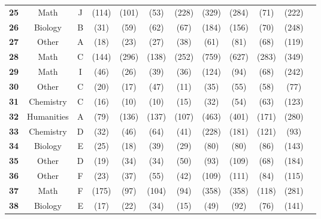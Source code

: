 \begin{table*}[htb]
\begin{center}
\begin{tiny}
\begin{tabular}{l|c|c|ccccccccc}
\textbf{25} & Math & J  & \X [D] (114) & \X [I] (101) & \X [K] (53) & \X [G] (228) & \X [A] (329) & \X [I] (284) & \X [K] (71) & \X [K] (222)\\
\textbf{26} & Biology & B  & \X [C] (31) & \X [C] (59) & \X [D] (62) & \X [C] (67) & \X [C] (184) & \X [C] (156) & \X [error] (70) & \X [error] (248)\\
\textbf{27} & Other & A  & \C [A] (18) & \X [B] (23) & \X [B] (27) & \X [B] (38) & \X [B] (61) & \X [B] (81) & \C [A] (68) & \X [C] (119)\\
\textbf{28} & Math & C  & \X [D] (144) & \X [D] (296) & \X [D] (138) & \X [D] (252) & \X [D] (759) & \X [D] (627) &\X [D] (283) & \X [D] (349)\\
\textbf{29} & Math &  I  & \X [D] (46) & \X [D] (26) & \X [D] (39) & \X [D] (36) & \X [D] (124) & \X [D] (94) & \X [D] (68) & \X [H] (242)\\
\textbf{30} & Other & C  & \X [B] (20) & \X [B] (17) & \X [python] (47) & \X [B] (11) & \X [B] (35) & \X [B] (55) & \X [error] (58) & \X [error] (77)\\
\textbf{31} & Chemistry &  C  & \X [B] (16) & \X [B] (10) & \X [B] (10) & \X [B] (15) & \X [B] (32) & \X [B] (54) & \X [B] (63) & \X [B] (123)\\
\textbf{32} & Humanities & A  & \X [None] (79) & \X [E] (136) & \X [B] (137) & \X [E] (107) & \X [D] (463) & \X [None] (401) & \X [None] (171) & \X [B] (280)\\
\textbf{33} & Chemistry  & D  & \X [A] (32) & \X [A] (46) & \X [A] (64) & \X [A] (41) & \X [A] (228) & \X [A] (181) & \X [A] (121) & \X [A] (93)\\
\textbf{34} & Biology &  E  & \X [C] (25) & \X [C] (18) & \X [C] (39) & \C [E] (29) & \X [C] (80) & \X [C] (80) & \X [C] (86) & \X [C] (143)\\
\textbf{35} & Other  & D  & \X [G] (19) & \X [E] (34) & \X [E] (34) & \X [E] (50) & \X [E] (93) & \X [E] (109) & \X [E] (68) & \X [None] (184)\\
\textbf{36} & Other &  F  & \X [C] (23) & \X [C] (37) & \X [C] (55) & \X [C] (42) & \X [C] (109) & \X [C] (111) & \X [C] (84) & \X [error] (115)\\
\textbf{37} & Math &  F  & \X [I] (175) & \X [D] (97) & \C [F] (104) & \C [F] (94) & \C [F] (358) & \X [F] (358) & \C [F] (118) & \C [F] (281)\\
\textbf{38} & Biology & E  & \X [A] (17) & \X [A] (22) & \X [A] (34) & \X [A] (15) & \X [A] (49) & \X [A] (92) & \X [A] (76) & \X [A] (141)\\

\end{tabular}
\end{tiny}
\end{center}
\end{table*}
